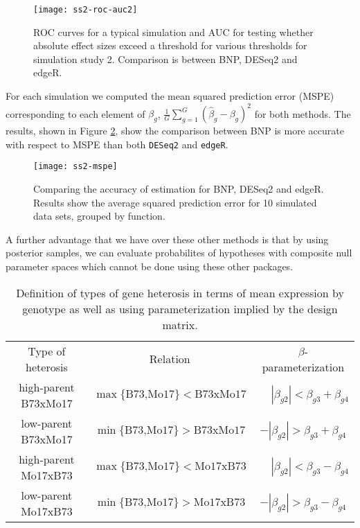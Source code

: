 \begin{figure}[ht!]
\centering
\texttt{[image: ss2-roc-auc2]}
\caption{\small ROC curves for a typical simulation and AUC for testing whether absolute effect sizes exceed a threshold for various thresholds for simulation study 2. Comparison is between BNP, DESeq2 and edgeR.}
\label{ss2-roc}
\end{figure}

For each simulation we computed the mean squared prediction error (MSPE) corresponding to each element of $\beta_g$, $\frac{1}{G}\sum_{g=1}^G (\hat{\beta}_g-\beta_g)^2$ for both methods. The results, shown in Figure \ref{ss2-mspe}, show the comparison between BNP is more accurate with respect to MSPE than both \texttt{DESeq2} and \texttt{edgeR}.

\begin{figure}[ht!]
\centering
\texttt{[image: ss2-mspe]}
\begin{minipage}{.8\textwidth}
\caption{\small Comparing the accuracy of estimation for BNP, DESeq2 and edgeR. Results show the average squared prediction error for 10 simulated data sets, grouped by function.}
\end{minipage}
\label{ss2-mspe}
\end{figure}


A further advantage that we have over these other methods is that by using posterior samples, we can evaluate probabilites of hypotheses with composite null parameter spaces which cannot be done using these other packages.

\begin{table}
\caption{Definition of types of gene heterosis in terms of mean expression by genotype as well as using parameterization implied by the design matrix.}
\label{def-heterosis}
\begin{tabular}{ccc}
Type of heterosis & Relation & $\beta$-parameterization\\
high-parent B73xMo17 & $\max\{\mbox{B73,Mo17}\} < \mbox{B73xMo17}$ & $\phantom{-}|\beta_{g2}| < \beta_{g3} + \beta_{g4}$\\
low-parent B73xMo17  & $\min\{\mbox{B73,Mo17}\} > \mbox{B73xMo17}$ & $-|\beta_{g2}| > \beta_{g3} + \beta_{g4}$\\
high-parent Mo17xB73 & $\max\{\mbox{B73,Mo17}\} < \mbox{Mo17xB73}$ & $\phantom{-}|\beta_{g2}| < \beta_{g3} - \beta_{g4}$\\
low-parent Mo17xB73  & $\min\{\mbox{B73,Mo17}\} > \mbox{Mo17xB73}$ & $-|\beta_{g2}| > \beta_{g3} - \beta_{g4}$
\end{tabular}
\end{table}

